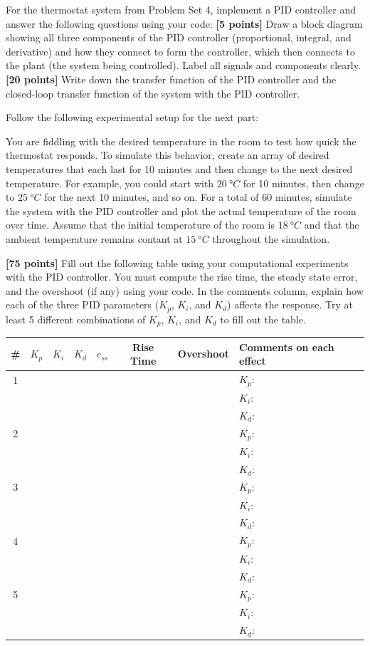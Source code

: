 \documentclass{ee122_pset}
\author{\rule{3cm}{0.4pt}} %
\begin{document}
For the thermostat system from Problem Set 4, implement a PID controller and answer the following questions using your code:
\problempart \textbf{[5 points]} Draw a block diagram showing all three components of the PID controller (proportional, integral, and derivative) and how they connect to form the controller, which then connects to the plant (the system being controlled). Label all signals and components clearly.
\problempart \textbf{[20 points]} Write down the transfer function of the PID controller and the closed-loop transfer function of the system with the PID controller.

Follow the following experimental setup for the next part:

You are fiddling with the desired temperature in the room to test how quick the thermostat responds. To simulate this behavior, create an array of desired temperatures that each last for 10 minutes and then change to the next desired temperature. For example, you could start with $\SI{20}{\degree C}$ for 10 minutes, then change to $\SI{25}{\degree C}$ for the next 10 minutes, and so on. For a total of 60 minutes, simulate the system with the PID controller and plot the actual temperature of the room over time. Assume that the initial temperature of the room is $\SI{18}{\degree C}$ and that the ambient temperature remains contant at $\SI{15}{\degree C}$ throughout the simulation. 

\problempart \textbf{[75 points]} Fill out the following table using your computational experiments with the PID controller. You must compute the rise time, the steady state error, and the overshoot (if any) using your code. In the comments column, explain how each of the three PID parameters ($K_p$, $K_i$, and $K_d$) affects the response. Try at least 5 different combinations of $K_p$, $K_i$, and $K_d$ to fill out the table. 

\begin{center}
\begin{tabular}{|c|c|c|c|c|c|c|p{6cm}|}
\hline
\# & $K_p$ & $K_i$ & $K_d$ & $e_{ss}$ & Rise Time & Overshoot & Comments on each effect \\
\hline
1 &  &  &  &  &  &  & $K_p$: \\ &&&&&&& $K_i$: \\ &&&&&&& $K_d$: \\
\hline
2 & &  &  &  &  &  & $K_p$: \\ &&&&&&& $K_i$: \\ &&&&&&& $K_d$: \\
\hline
3 & &  &  &  &  &  & $K_p$: \\ &&&&&&& $K_i$: \\ &&&&&&& $K_d$: \\
\hline
4 & &  &  &  &  &  & $K_p$: \\ &&&&&&& $K_i$: \\ &&&&&&& $K_d$: \\
\hline
5 & &  &  &  &  &  & $K_p$: \\ &&&&&&& $K_i$: \\ &&&&&&& $K_d$: \\
\hline
\end{tabular}
\end{center}
\end{document}

